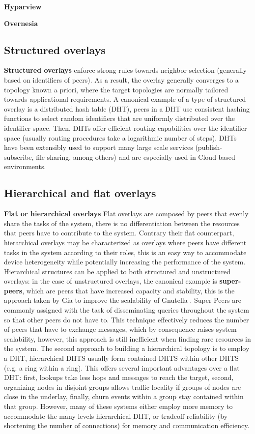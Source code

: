 \textbf{Hyparview}

\textbf{Overnesia}

\subsection{Structured overlays} 

\textbf{Structured overlays} enforce strong rules towards neighbor selection (generally based on identifiers of peers). As a result, the overlay generally converges to a topology known a priori, where the target topologies are normally tailored towards applicational requirements. A canonical example of a type of structured overlay is a distributed hash table (DHT), peers in a DHT use consistent hashing functions to select random identifiers that are uniformly distributed over the identifier space. Then, DHTs offer efficient routing capabilities over the identifier space (usually routing procedures take a logarithmic number of steps). DHTs have been extensibly used to support many large scale services (publish-subscribe, file sharing, among others) and are especially used in Cloud-based environments. 

\subsection{Hierarchical and flat overlays}

\textbf{Flat or hierarchical overlays} Flat overlays are composed by peers that evenly share the tasks of the system, there is no differentiation between the resources that peers have to contribute to  the system. Contrary their flat counterpart, hierarchical overlays may be characterized as overlays where peers have different tasks in the system according to their roles, this is an easy way to accommodate device heterogeneity while potentially increasing the performance of the system. Hierarchical structures can be applied to both structured and unstructured overlays: in the case of unstructured overlays, the canonical example is \textbf{super-peers}, which are peers that have increased capacity and stability, this is the approach taken by Gia \cite{Chawathe2003} to improve the scalability of Gnutella \cite{gnutella_gtk}. Super Peers are commonly assigned with the task of disseminating queries throughout the system so that other peers do not have to. This technique effectively reduces the number of peers that have to exchange messages, which by consequence raises system scalability, however, this approach is still inefficient when finding rare resources in the system. The second approach to building a hierarchical topology is to employ a DHT, hierarchical DHTS usually form contained DHTS within other DHTS (e.g. a ring within a ring). This offers several important advantages over a flat DHT: first, lookups take less hops and messages to reach the target, second, organizing nodes in disjoint groups allows traffic locality if groups of nodes are close in the underlay, finally, churn events within a group stay contained within that group. However, many of these systems either employ more memory to accommodate the many levels hierarchical DHT, or tradeoff reliability (by shortening the number of connections) for memory and communication efficiency.

